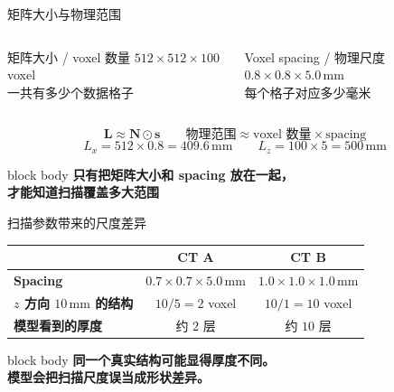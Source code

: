 \documentclass[aspectratio=169,14pt]{beamer}
\newcommand{\unit}[1]{\,\mathrm{#1}}
\newcommand{\takeaway}[1]{%
  \begin{beamercolorbox}[wd=\linewidth,sep=.22cm,center,rounded=true,shadow=true]{block body}
    \textcolor{BeamerDeep}{\textbf{#1}}
  \end{beamercolorbox}
}
\begin{document}
\begin{frame}{矩阵大小与物理范围}
  \begin{columns}[T,onlytextwidth]
      \begin{block}{矩阵大小 / voxel 数量}
        \centering
        $512\times512\times100$ voxel\\[-0.02cm]
        {\small 一共有多少个数据格子}
      \end{block}
      \begin{block}{Voxel spacing / 物理尺度}
        \centering
        $0.8\times0.8\times5.0\unit{mm}$\\[-0.02cm]
        {\small 每个格子对应多少毫米}
      \end{block}
  \end{columns}

  \vspace{-0.08cm}
  \[
    \boxed{\mathbf{L}\approx\mathbf{N}\odot\mathbf{s}}
    \qquad
    \text{物理范围}\approx\text{voxel 数量}\times\text{spacing}
  \]
  \vspace{-0.28cm}
  \[
    L_x=512\times0.8=409.6\unit{mm}
    \qquad
    L_z=100\times5=500\unit{mm}
  \]
  \vspace{-0.12cm}
  \takeaway{{\fontsize{14}{18}\selectfont
    只有把矩阵大小和 spacing 放在一起，\\
    才能知道扫描覆盖多大范围}}
\end{frame}

\begin{frame}{扫描参数带来的尺度差异}
  \centering
  {\small
    \renewcommand{\arraystretch}{1.27}
    \begin{tabular}{>{\bfseries}lcc}
      \toprule
        & \textcolor{BeamerRoyal}{CT A} & \textcolor{BeamerRoyal}{CT B}\\
      \midrule
      Spacing & $0.7\times0.7\times5.0\unit{mm}$ & $1.0\times1.0\times1.0\unit{mm}$\\
      $z$ 方向 $10\unit{mm}$ 的结构 & $10/5=2$ voxel & $10/1=10$ voxel\\
      模型看到的厚度 & 约 $2$ 层 & 约 $10$ 层\\
      \bottomrule
    \end{tabular}
  }

  \vspace{0.42cm}
  \takeaway{{\fontsize{14}{18}\selectfont
    同一个真实结构可能显得厚度不同。\\
    模型会把扫描尺度误当成形状差异。}}
\end{frame}
\end{document}
